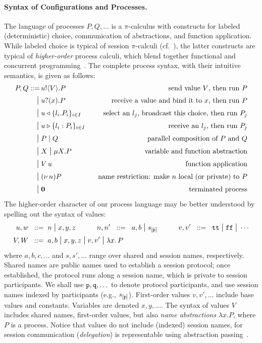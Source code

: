 \documentclass[runningheads,plain]{llncs}
\begin{document}
\paragraph{Syntax of Configurations and Processes.}
The language of processes $P, Q, \ldots$ is a $\pi$-calculus with constructs for labeled (deterministic) choice, communication of abstractions, and function application.
While labeled choice is typical of session $\pi$-calculi (cf.~\cite{DBLP:conf/esop/HondaVK98}), the latter constructs are typical of \emph{higher-order} process calculi, which blend together functional and concurrent programming~\cite{DBLP:journals/tcs/Sangiorgi01}. The complete process syntax, with their intuitive semantics, is given as follows:
\begin{align*}
P, Q ::= \, 
        & u ! \langle V \rangle .{P} \,\,\, \, \, &\text{send value $V$, then run $P$} \\
\;\mbox{\large{$\mid$}}\; & u ? (x) .{P} \,\,\, \, \, & \text{receive a value and bind it to $x$, then run $P$} \\
\;\mbox{\large{$\mid$}}\; &  u \triangleleft \{l_i. P_i\}_{i\in I}\,\,\, \, \, & \text{select an $l_j$, broadcast this choice, then run $P_j$} \\
\;\mbox{\large{$\mid$}}\; & u \triangleright \{l_i:P_i\}_{i \in I} \,\,\, \, \, & \text{receive an   $l_j$, then run  $P_j$} \\
\;\mbox{\large{$\mid$}}\;   & P \;|\; Q  &\text{parallel composition of $P$ and $Q$} \\
\;\mbox{\large{$\mid$}}\;  & X \;\mbox{\large{$\mid$}}\;  \mu X. P \,\,\, &\text{variable and function abstraction}\\
\;\mbox{\large{$\mid$}}\; & V\, {u} \,\,\, &\text{function application} \\
\;\mbox{\large{$\mid$}}\;  & (\nu\, n)P \,\,\, &\text{name restriction: make $n$ local (or private) to $P$} \\
\;\mbox{\large{$\mid$}}\;  & \mathbf{0} \,\,\, &\text{terminated process}
\end{align*}
The higher-order character of our process language may be better understood by spelling out the syntax of values:
\begin{align*}
u,w  \;\;::=\;\;& n \;\mbox{\large{$\mid$}}\; x,y,z
\qquad \quad
n,n' \;\;::=\;\; a,b \;\mbox{\large{$\mid$}}\; s_{[\mathtt{p}]}
\qquad \quad
 {v},  {v}'  \;\;::=\;\;   \mathtt{tt} \;\mbox{\large{$\mid$}}\; \mathtt{ff} \;\mbox{\large{$\mid$}}\; \cdots
\\
V,W \;\;::=\;\; & {a,b} \;\mbox{\large{$\mid$}}\;  x,y,z \;\mbox{\large{$\mid$}}\;  v, v' \;\mbox{\large{$\mid$}}\; {\lambda x.\,P}
\end{align*}
\noindent 
where  $a,b,c,\ldots$ and $s,s',\ldots$ range over shared and session names, respectively.
Shared names are public names used to establish a session protocol; once established, the protocol runs along a session name, which is private to session participants.
We shall use $\mathtt{p}, \mathtt{q}, \ldots$ to denote protocol participants, and 
use session names indexed by participants (e.g., $s_{[\mathtt{p}]}$).
First-order values $v,v',\ldots$ 
include base values and constants. Variables are denoted  $x,y, \ldots$. 
The syntax of values $V$ includes shared names, 
first-order values, but also \emph{name abstractions} $\lambda x. P$, where $P$ is a process.
Notice that values do not include (indexed) session names, for session communication (\emph{delegation}) is  representable using abstraction passing~\cite{KPY2016}.
\end{document}
